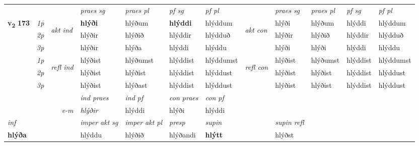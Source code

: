 \begin{longtable}[l]{X>{\footnotesize\itshape}llXXXXlXXXX}
 & &   & \textit{praes sg}  & \textit{praes pl}    & \textit{ pf sg} & \textit{pf pl} & & \textit{praes sg}  & \textit{praes pl}    & \textit{pf sg} & \textit{pf pl }  \\ \cmidrule{4-7} \cmidrule{9-12}
 \multirow{2}{*}{{{\textbf{v{\textsubscript{2}}} \Large{\textbf{173}}}}}  & 1p & \multirow{3}{*}{\begin{turn}{90}\textit{akt ind}\end{turn}} & \textbf{hlýði} & hlýðum & \textbf{hlýddi} & hlýddum & \multirow{3}{*}{\begin{turn}{90}\textit{akt con}\end{turn}} &hlýði & hlýðum & hlýddi & hlýddum\\*
 & 2p &  &  hlýðir  & hlýðið & hlýddir & hlýdduð & & hlýðir & hlýðið & hlýddir & hlýdduð \\*
 & 3p &  & hlýðir & hlýða & hlýddi & hlýddu & & hlýði & hlýði& hlýddi & hlýddu \\*
\cmidrule{4-7} \cmidrule{9-12}
 & 1p & \multirow{3}{*}{\begin{turn}{90}\textit{refl ind}\end{turn}}  & hlýðist & hlýðumst & hlýddist & hlýddumst & \multirow{3}{*}{\begin{turn}{90}\textit{refl con}\end{turn}}  &hlýðist & hlýðumst & hlýddist & hlýddumst \\*
 & 2p &  & hlýðist & hlýðist & hlýddist & hlýddust & &hlýðist & hlýðist & hlýddist & hlýddust \\*
 & 3p  & & hlýðist & hlýðast & hlýddist & hlýddust & & hlýðist & hlýðist& hlýddist & hlýddust \\*
\cmidrule{4-7} \cmidrule{9-12}

   && &  \textit{ind praes} & \textit{ind pf} & \textit{con praes} & \textit{con pf} \\*
\multicolumn{3}{r}{\textit{e-m}} & hlýðir & hlýddi & hlýði & hlýddi \\*

\cmidrule{4-7}
   {\textit{inf}} & &  & \textit{imper akt sg} & \textit{imper akt pl}   & \textit{presp} & \textit{supin} && \textit{supin refl}  \\*
  {\textbf{hlýða}} & && hlýddu  & hlýðið   & hlýðandi &  \textbf{hlýtt} && hlýðst  \\*

\midrule


\end{longtable}

